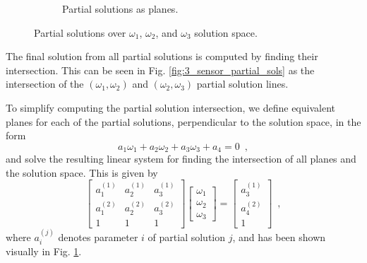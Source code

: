 \begin{figure}[tb]
\begin{subfigure}[t]{0.3\textwidth}
\begin{center}
      \end{center}
      \caption{Partial solutions as planes.}
      \label{fig:3sen_planes}
   \end{subfigure}
   \caption{Partial solutions over $\omega_1$, $\omega_2$, and $\omega_3$ solution space.}
   \label{fig:partial_sols_and_planes}
\end{figure}
The final solution from all partial solutions is computed by finding their intersection. This can be seen in Fig. \ref{fig:3_sensor_partial_sols} as the intersection of the $(\omega_1,\omega_2)$ and $(\omega_2,\omega_3)$ partial solution lines.

To simplify computing the partial solution intersection, we define equivalent planes for each of the partial solutions, perpendicular to the solution space, in the form
\begin{equation}
   a_1\omega_1 + a_2\omega_2 +a_3\omega_3 + a_4 = 0\enspace, \label{eqn:3sen_plane_eq}
\end{equation}
and solve the resulting linear system for finding the intersection of all planes and the solution space. This is given by
\begin{equation}
   \begin{bmatrix}
      a_1^{(1)} & a_2^{(1)} & a_3^{(1)} \\
      a_1^{(2)} & a_2^{(2)} & a_3^{(2)} \\
      1 & 1 & 1
   \end{bmatrix}
   \begin{bmatrix}
      \omega_1 \\
      \omega_2 \\
      \omega_3
   \end{bmatrix}
   =
   \begin{bmatrix}
      a_3^{(1)} \\
      a_4^{(2)} \\
      1
   \end{bmatrix}\enspace, \label{eqn:3sen_plane_sol_eq}
\end{equation}
where $a_i^{(j)}$ denotes parameter $i$ of partial solution $j$, and has been shown visually in Fig. \ref{fig:3sen_planes}.

